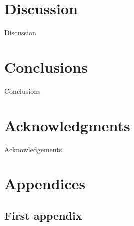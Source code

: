 \documentclass[12pt,twoside]{article}
\begin{document}
\section{Discussion}
Discussion
\newpage


\section{Conclusions}
Conclusions
\newpage

\section*{Acknowledgments}
Acknowledgements

\appendix
\section{Appendices}
\subsection{First appendix}
\end{document}
